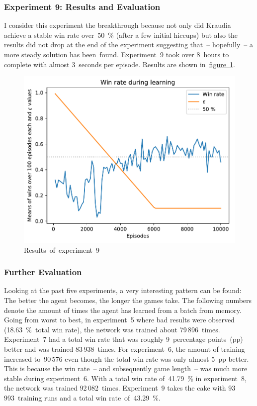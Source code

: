\documentclass[a4paper,titlepage]{article}
\begin{document}
\subsubsection*{Experiment 9: Results and Evaluation}

I consider this experiment the breakthrough because not only did Kraudia achieve a stable win rate over~50~\% (after a few initial hiccups) but also the results did not drop at the end of the experiment suggesting that~-- hopefully~-- a more steady solution has been~found. Experiment~9 took over 8~hours to complete with almost 3~seconds per episode. Results are shown in~\hyperref[fig:exp9]{figure~\ref*{fig:exp9}}.
\begin{figure}
  \centering
  \includegraphics[width=\textwidth]{../experiments/exp9/win_stats.pdf}
  \caption{Results~of~experiment~9}
  \label{fig:exp9}
\end{figure}
\medskip

\subsubsection*{Further Evaluation}

Looking at the past five experiments, a very interesting pattern can be found: The better the agent becomes, the longer the games take. The following numbers denote the amount of times the agent has learned from a batch from memory. Going from worst to best, in experiment~5 where bad results were observed (18.63~\%~total win rate), the network was trained about 79\,896~times. Experiment~7 had a total win rate that was roughly 9~percentage points~(pp) better and was trained 83\,938~times. For experiment~6, the amount of training increased to~90\,576 even though the total win rate was only almost 5~pp better. This is because the win rate~-- and subsequently game length~-- was much more stable during experiment~6. With a total win rate of~41.79~\% in experiment~8, the network was trained 92\,082~times. Experiment~9 takes the cake with 93\,993~training runs and a total win rate~of~43.29~\%.
\end{document}
